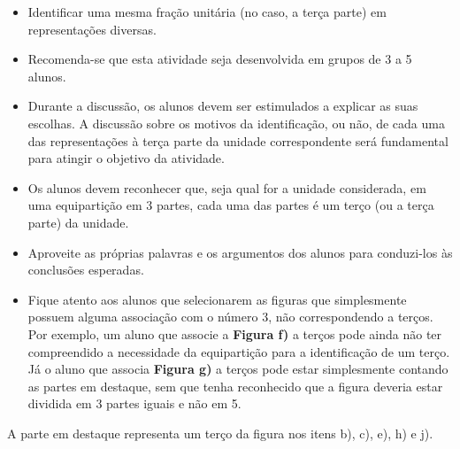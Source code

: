 \begin{atividade}\label{chap1-ativ6}
\objetivos
\begin{itemize} %
    \item       Identificar uma mesma fração unitária (no caso, a terça parte) em representações diversas.
\end{itemize} %

\discussoes
\begin{itemize} %
    \item       Recomenda-se que esta atividade seja desenvolvida em grupos de 3 a 5 alunos.
    \item       Durante a discussão, os alunos devem ser estimulados a explicar as suas escolhas. A discussão sobre os motivos da identificação, ou não, de cada uma das representações à terça parte da unidade correspondente será fundamental para atingir o objetivo da atividade.
    \item       Os alunos devem reconhecer que, seja qual for a unidade considerada, em uma equipartição em 3 partes, cada uma das partes é um terço (ou a terça parte) da unidade.
    \item       Aproveite as próprias palavras e os argumentos dos alunos para conduzi-los às conclusões esperadas.
    \item       Fique atento aos alunos que selecionarem as figuras que simplesmente possuem alguma associação com o número 3, não correspondendo a terços. Por exemplo, um aluno que associe a       {\bfseries Figura f)} a terços pode ainda não ter compreendido a necessidade da equipartição para a identificação de um terço. Já o aluno que associa       {\bfseries Figura g)}       a terços pode estar simplesmente contando as partes em destaque, sem que tenha reconhecido que a figura deveria estar dividida em 3 partes iguais e não em 5.
\end{itemize} %

\solucao
A parte em destaque representa um terço da figura nos itens b), c), e), h) e j).

\end{atividade}

\clearpage

